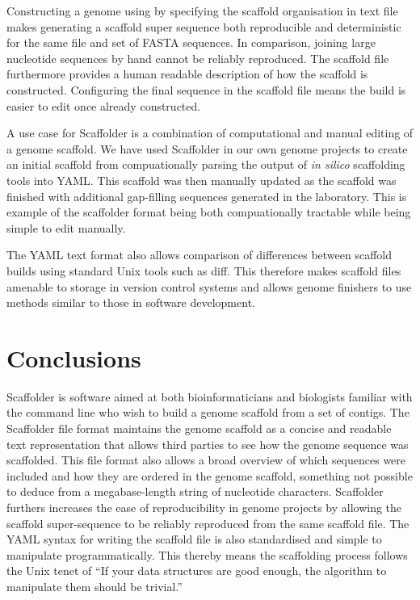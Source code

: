 \documentclass[10pt]{bmc_article}
\newenvironment{bmcformat}{\begin{raggedright}\baselineskip20pt\sloppy\setboolean{publ}{false}}{\end{raggedright}\baselineskip20pt\sloppy}
\begin{document}
\begin{bmcformat}
Constructing a genome using by specifying the scaffold organisation in text
file makes generating a scaffold super sequence both reproducible and
deterministic for the same file and set of FASTA sequences. In comparison,
joining large nucleotide sequences by hand cannot be reliably reproduced. The
scaffold file furthermore provides a human readable description of how the
scaffold is constructed. Configuring the final sequence in the scaffold file
means the build is easier to edit once already constructed. \pb

A use case for Scaffolder is a combination of computational and manual editing
of a genome scaffold. We have used Scaffolder in our own genome projects to
create an initial scaffold from compuationally parsing the output of \emph{in
silico} scaffolding tools into YAML. This scaffold was then manually updated as
the scaffold was finished with additional gap-filling sequences generated in
the laboratory. This is example of the scaffolder format being both
compuationally tractable while being simple to edit manually. \pb

The YAML text format also allows comparison of differences between scaffold
builds using standard Unix tools such as diff. This therefore makes scaffold
files amenable to storage in version control systems and allows genome
finishers to use methods similar to those in software development. \pb 

\clearpage

\section*{Conclusions} %

Scaffolder is software aimed at both bioinformaticians and biologists familiar
with the command line who wish to build a genome scaffold from a set of
contigs. The Scaffolder file format maintains the genome scaffold as a concise
and readable text representation that allows third parties to see how the
genome sequence was scaffolded. This file format also allows a broad overview
of which sequences were included and how they are ordered in the genome
scaffold, something not possible to deduce from a megabase-length string of
nucleotide characters. Scaffolder furthers increases the ease of
reproducibility in genome projects by allowing the scaffold super-sequence to
be reliably reproduced from the same scaffold file. The YAML syntax for writing
the scaffold file is also standardised and simple to manipulate
programmatically. This thereby means the scaffolding process follows the Unix
tenet of ``If your data structures are good enough, the algorithm to manipulate
them should be trivial.''


\end{bmcformat}
\end{document}
